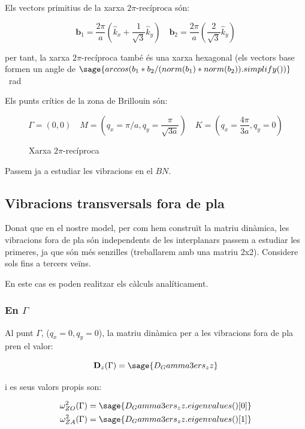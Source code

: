 \documentclass[12pt]{article} %
\let\vec\mathbf %
\begin{document}
Els vectors primitius de la xarxa $2\pi\text{-recíproca}$ són:

\begin{equation}
\label{eq:11}
\vec b_1=\frac{2\pi}{a}\left(\hat k_{x}+\frac{1}{\sqrt{3}}\hat k_{y}\right)\quad \vec b_2=\frac{2\pi}{a}\left(\frac{2}{\sqrt{3}}\hat k_y\right)
\end{equation} 

per tant, la xarxa $2\pi$-recíproca també és una xarxa hexagonal (els vectors base formen un angle de $\sage{arccos(b_1*b_2/(norm(b_1)*norm(b_2)).simplify())}$ \SI{}{\radian}

Els punts crítics de la zona de Brillouin són:

\begin{equation}
 \label{puntsbrillouin}
 \Gamma=(0,0)\quad M=\left(q_x=\pi/a,q_y=\frac{\pi}{\sqrt{3 a}}\right)\quad K=\left(q_x=\frac{4\pi}{3 a}, q_y=0\right)
\end{equation}

\newpage
\begin{figure}[h]
\centering
{}
\caption{Xarxa $2\pi$-recíproca}
\end{figure}


Passem ja a estudiar les vibracions en el $BN$.
\subsection{Vibracions transversals fora de pla}
Donat que en el nostre model, per com hem construït la matriu dinàmica, les vibracions fora de pla són independents de les interplanars passem a estudiar les primeres, ja que són més senzilles (treballarem amb una matriu 2x2). Considere sols fins a tercers veïns.

En este cas es poden realitzar els càlculs analíticament.

\subsubsection{En $\Gamma$}
Al punt $\Gamma$, ($q_x=0, q_y=0$), la matriu dinàmica  per a les vibracions fora de pla pren el valor:

\begin{equation}
\vec D_z(\Gamma)=\sage{D_Gamma3ers_zz}
\end{equation}

i es seus valors propis son:

\begin{equation}\begin{split}
\omega_{ZO}^2(\Gamma)&=\sage{D_Gamma3ers_zz.eigenvalues()[0]}\\
\omega_{ZA}^2(\Gamma)&=\sage{D_Gamma3ers_zz.eigenvalues()[1]} 
\end{split}
\end{equation}
\end{document}
